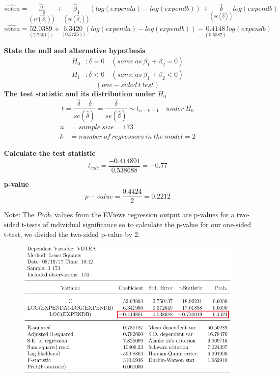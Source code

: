 \documentclass[12pt]{report}
\begin{document}
$$\widehat{votea} = \underset{(se(\hat{\beta}_0))}{\hat{\beta}_0} + \underset{(se(\hat{\beta}_1))}{\hat{\beta}_1}(log(expenda)-log(expendb)) + \underset{(se(\hat{\delta}))}{\hat{\delta}}log(expendb)$$
$$\widehat{votea} = \underset{(2.7501))}{52.0389} + \underset{(0.3726))}{6.3420}(log(expenda)-log(expendb)) - \underset{(0.5387)}{0.4148}log(expendb)$$

\noindent \textbf{State the null and alternative hypothesis}
\begin{align*}
H_0&: \delta = 0 \quad (same\ as\ \beta_1 + \beta_2 = 0) \\
H_1&: \delta < 0 \quad (same\ as\ \beta_1 + \beta_2 < 0)
\end{align*}
$$(one-sided\ t\ test)$$
\noindent \textbf{The test statistic and its distribution under $H_0$}
$$t = \dfrac{\hat{\delta} - \delta}{se(\hat{\delta})} = \dfrac{\hat{\delta}}{se(\hat{\delta})} \sim t_{n-k-1} \quad under\ H_0$$
\begin{align*}
n &= sample\ size = 173 \\
k &= number\ of\ regressors\ in\ the\ model = 2
\end{align*}

\noindent \textbf{Calculate the test statistic}
$$t_{calc} = \dfrac{-0.414801}{0.538688} = -0.77$$


\noindent \textbf{p-value}
$$p-value = \dfrac{0.4424}{2} = 0.2212$$

\noindent Note: The $Prob.$ values from the EViews regression output are p-values for a two-sided t-tests of individual significance so to calculate the p-value for our one-sided t-test, we divided the two-sided p-value by 2.

\begin{figure}[H]
	\centering
	\includegraphics{q1_27}
\end{figure}
\vspace{-\baselineskip}
\end{document}
